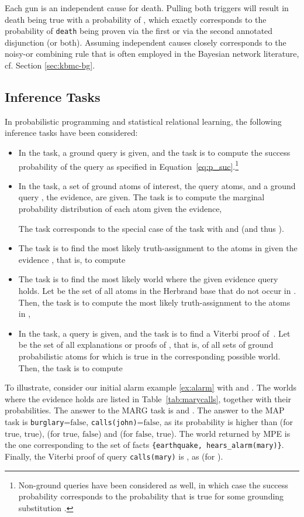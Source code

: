 \documentclass[a4paper]{article}
\newcommand{\true}{\ensuremath{\mathrm{true}}}
\newcommand{\false}{\ensuremath{\mathrm{false}}}
\begin{document}
Each gun is an independent cause for death. Pulling both triggers will
result in death being true with a probability of ,
which exactly corresponds to the probability of \verb|death| being
proven via the first or via the second annotated disjunction (or
both). 
Assuming independent causes closely corresponds to the noisy-or combining rule 
that is often employed in the Bayesian network literature, cf. Section
\ref{sec:kbmc-bg}. 


\subsection{Inference Tasks}\label{sec:tasks}
In probabilistic programming and statistical relational learning, the following inference tasks have been considered:
\begin{itemize}
\item In the  task, a ground query  is given, and the task is to compute
 the success probability of the query as specified in Equation~\eqref{eq:p_suc}.\footnote{Non-ground queries have 
    been considered as well, in which case the success probability
    corresponds to the probability that  is true for some
    grounding substitution .}
\item In the  task, a set  of ground atoms of interest, the query atoms,
and a ground query , the evidence, are given. 
The task is to compute the marginal probability distribution of each
atom  given the evidence, 

The  task corresponds to the special case of 
the  task with  and  (and
thus ).
\item
The  task is to find the most likely truth-assignment  to the 
atoms in  given the evidence , that is, to compute
 
\item
The  task is to find the most likely world where the given
evidence query  holds. Let  be the set of all atoms in the
Herbrand base that do not occur in . Then, the task is to compute 
the most likely truth-assignment  to the atoms in ,

\item
In the  task, a query  is given, and the task is to find
a Viterbi proof of~. Let  be the set of all explanations or
proofs of
, that is, of all sets  of ground probabilistic atoms for which
 is true in the corresponding possible world. Then, the task is to
compute

\end{itemize}
To illustrate, consider our initial alarm example \eqref{ex:alarm} with 
 and 
. The worlds  where the
evidence holds are listed in Table~\ref{tab:marycalls}, together with
their probabilities. 
The answer to the
MARG 
task 
is  and
. The answer to the MAP
task is \verb|burglary|=\false, \verb|calls(john)|=\false, as its
probability  is higher than  (for \true, \true), 
(for \true, \false) and  (for \false, \true). The world returned by MPE is the one corresponding
to the set of facts \verb|{earthquake, hears_alarm(mary)}|. Finally,
the Viterbi proof of query \verb|calls(mary)| is , as  (for ). 
\end{document}
